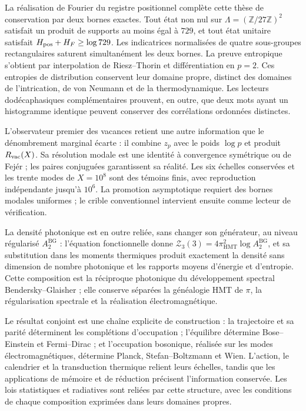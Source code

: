 La réalisation de Fourier du registre positionnel complète cette thèse de
conservation par deux bornes exactes. Tout état non nul sur
\(\Lambda=(\mathbb Z/27\mathbb Z)^2\) satisfait un produit de supports
au moins égal à \(729\), et tout état unitaire satisfait
\(H_{\rm pos}+H_F\ge\log729\). Les indicatrices normalisées de quatre
sous-groupes rectangulaires saturent simultanément les deux bornes. La preuve
entropique s’obtient par interpolation de Riesz--Thorin et différentiation
en \(p=2\). Ces entropies de distribution conservent leur domaine propre,
distinct des domaines de l’intrication, de von Neumann et de la thermodynamique.
Les lecteurs dodécaphasiques complémentaires prouvent, en outre, que deux
mots ayant un histogramme identique peuvent conserver des corrélations ordonnées
distinctes.

L’observateur premier des vacances retient une autre information que le dénombrement
marginal écarte : il combine \(z_p\) avec le poids \(\log p\) et produit
\(R_{\rm vac}(X)\). Sa résolution modale est une identité à convergence
symétrique ou de Fejér ; les paires conjuguées garantissent sa réalité. Les six
échelles conservées et les trente modes de \(X=10^8\) sont des témoins finis,
avec reproduction indépendante jusqu’à \(10^6\). La promotion asymptotique
requiert des bornes modales uniformes ; le crible conventionnel intervient ensuite
comme lecteur de vérification.

La densité photonique est en outre reliée, sans changer son générateur, au
niveau régularisé \(A_2^{\mathrm{BG}}\) : l’équation fonctionnelle donne
\(\mathcal Z_3(3)=4\pi_{\mathrm{HMT}}^2\log A_2^{\mathrm{BG}}\), et sa
substitution dans les moments thermiques produit exactement la densité
sans dimension de nombre photonique et les rapports moyens d’énergie et d’entropie.
Cette composition est la réciproque photonique du développement spectral
Bendersky--Glaisher ; elle conserve séparées la généalogie HMT de \(\pi\), la
régularisation spectrale et la réalisation électromagnétique.


Le résultat conjoint est une chaîne explicite de construction :
la trajectoire et sa parité déterminent les complétions d’occupation ;
l’équilibre détermine Bose--Einstein et Fermi--Dirac ; et l’occupation
bosonique, réalisée sur les modes électromagnétiques, détermine
Planck, Stefan--Boltzmann et Wien. L’action, le calendrier et la
transduction thermique relient leurs échelles, tandis que les applications de mémoire
et de réduction précisent l’information conservée. Les lois statistiques
et radiatives sont reliées par cette structure, avec les
conditions de chaque composition exprimées dans leurs domaines propres.

\par\endgroup
